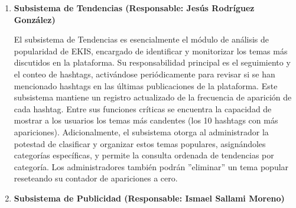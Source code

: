 \documentclass[twoside,openright,titlepage,numbers=noenddot,headinclude,footinclude=true,
cleardoublepage=empty,abstractoff,BCOR=5mm,paper=a4,fontsize=12pt,main=spanish,pdfstartpage=1]{scrreprt}
\theoremstyle{plain}
\begin{document}
\begin{itemize}
\begin{enumerate}
      El subsistema de Publicaciones tiene la responsabilidad central de administrar todo el contenido generado por los miembros de la red social. Su función principal es el área de la difusión de contenido, permitiendo a los usuarios la creación de nuevas entradas, las cuales pueden incluir nombres, descripciones, categorías e imágenes opcionales. Este subsistema se encarga de que los usuarios puedan modificar posteriormente el contenido que han creado, asegurando que solo el propietario de la publicación pueda hacerlo, y de gestionar las interacciones de la comunidad, específicamente la funcionalidad de “Me gusta”. Una responsabilidad clave es la presentación de la información, permitiendo a los usuarios visualizar las publicaciones de aquellos a quienes siguen. Además, el subsistema garantiza la trazabilidad de los datos, ya que la eliminación de una publicación no resulta en un borrado físico, sino en un marcado que la oculta de la vista pública.\\

      \item \textbf{Subsistema de Tendencias (Responsable: Jesús Rodríguez González)}

      El subsistema de Tendencias es esencialmente el módulo de análisis de popularidad de EKIS, encargado de identificar y monitorizar los temas más discutidos en la plataforma. Su responsabilidad principal es el seguimiento y el conteo de hashtags, activándose periódicamente para revisar si se han mencionado hashtags en las últimas publicaciones de la plataforma. Este subsistema mantiene un registro actualizado de la frecuencia de aparición de cada hashtag. Entre sus funciones críticas se encuentra la capacidad de mostrar a los usuarios los temas más candentes (los 10 hashtags con más apariciones). Adicionalmente, el subsistema otorga al administrador la potestad de clasificar y organizar estos temas populares, asignándoles categorías específicas, y permite la consulta ordenada de tendencias por categoría. Los administradores también podrán ''eliminar'' un tema popular reseteando su contador de apariciones a cero.\\

      \item \textbf{Subsistema de Publicidad (Responsable: Ismael Sallami Moreno)}


\end{enumerate}
\end{itemize}
\end{document}
